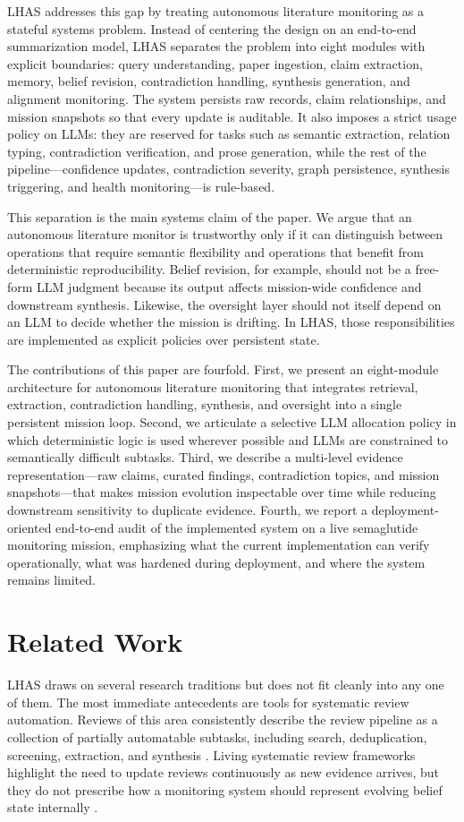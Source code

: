 \documentclass[manuscript,screen,review]{jair}
\begin{document}
LHAS addresses this gap by treating autonomous literature monitoring as a stateful systems problem. Instead of centering the design on an end-to-end summarization model, LHAS separates the problem into eight modules with explicit boundaries: query understanding, paper ingestion, claim extraction, memory, belief revision, contradiction handling, synthesis generation, and alignment monitoring. The system persists raw records, claim relationships, and mission snapshots so that every update is auditable. It also imposes a strict usage policy on LLMs: they are reserved for tasks such as semantic extraction, relation typing, contradiction verification, and prose generation, while the rest of the pipeline---confidence updates, contradiction severity, graph persistence, synthesis triggering, and health monitoring---is rule-based.

This separation is the main systems claim of the paper. We argue that an autonomous literature monitor is trustworthy only if it can distinguish between operations that require semantic flexibility and operations that benefit from deterministic reproducibility. Belief revision, for example, should not be a free-form LLM judgment because its output affects mission-wide confidence and downstream synthesis. Likewise, the oversight layer should not itself depend on an LLM to decide whether the mission is drifting. In LHAS, those responsibilities are implemented as explicit policies over persistent state.

The contributions of this paper are fourfold. First, we present an eight-module architecture for autonomous literature monitoring that integrates retrieval, extraction, contradiction handling, synthesis, and oversight into a single persistent mission loop. Second, we articulate a selective LLM allocation policy in which deterministic logic is used wherever possible and LLMs are constrained to semantically difficult subtasks. Third, we describe a multi-level evidence representation---raw claims, curated findings, contradiction topics, and mission snapshots---that makes mission evolution inspectable over time while reducing downstream sensitivity to duplicate evidence. Fourth, we report a deployment-oriented end-to-end audit of the implemented system on a live semaglutide monitoring mission, emphasizing what the current implementation can verify operationally, what was hardened during deployment, and where the system remains limited.

\section{Related Work}
LHAS draws on several research traditions but does not fit cleanly into any one of them. The most immediate antecedents are tools for systematic review automation. Reviews of this area consistently describe the review pipeline as a collection of partially automatable subtasks, including search, deduplication, screening, extraction, and synthesis \citep{Tsafnat2014,Marshall2019}. Living systematic review frameworks highlight the need to update reviews continuously as new evidence arrives, but they do not prescribe how a monitoring system should represent evolving belief state internally \citep{Elliott2017}.
\end{document}
